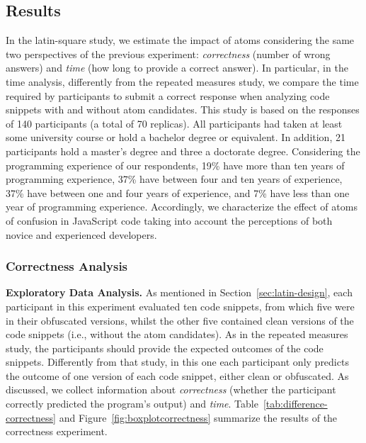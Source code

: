 
\subsection{Results}\label{sec:latin-results}

In the latin-square study, we estimate the impact of atoms considering the same two perspectives of the previous experiment: \emph{correctness} (number of wrong answers)
and \emph{time} (how long to provide a correct answer). In particular, in the time analysis, differently from the repeated  measures study, we compare the time required by participants to submit a correct response when analyzing code snippets with and without atom candidates. This study is based on the responses of 140 participants (a total of 70 replicas). All participants had taken at least some university course or hold a bachelor degree or equivalent. In addition, 21 participants hold a master's degree and three a doctorate degree. Considering the programming experience of our respondents, 19\% have more than ten years of programming experience, 37\% have between four and ten years of experience, 37\% have between one and four years of experience, and 7\% have less than one year of programming experience.  
Accordingly, we characterize the effect of atoms of confusion in JavaScript code taking into account the perceptions of both novice and experienced developers. 

\subsubsection{Correctness Analysis}\label{sec:latin:correct}

{\bf Exploratory Data Analysis.}
As mentioned in Section~\ref{sec:latin-design}, each participant in this experiment evaluated ten code snippets, from which five were in their obfuscated versions, whilst the other five contained clean versions of the code snippets (i.e., without the atom candidates). As in the repeated measures study, the participants should provide the expected outcomes of the code snippets. Differently from that study, in this one each participant only predicts the outcome of one version of each code snippet, either clean or obfuscated. As discussed, we collect information about \emph{correctness} (whether the participant correctly predicted the program's output) and \emph{time}. 
Table~\ref{tab:difference-correctness} and Figure~\ref{fig:boxplotcorrectness} summarize the results of the correctness experiment.

